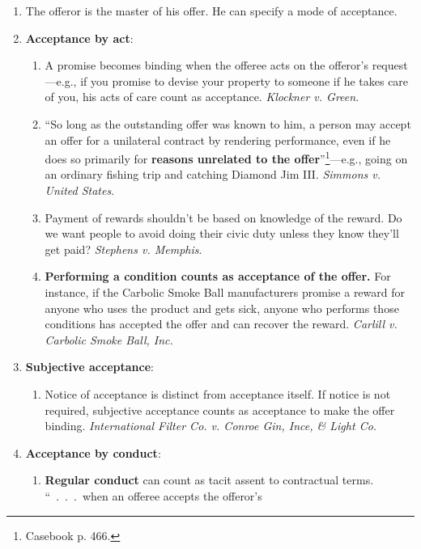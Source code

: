 \begin{enumerate}
    \item The offeror is the master of his offer. He can specify a mode of 
    acceptance.
    \item \textbf{Acceptance by act}:
    \begin{enumerate}
        \item A promise becomes binding when the offeree acts on the offeror's 
        request---e.g., if you promise to devise your property to someone if he 
        takes care of you, his acts of care count as acceptance. 
        \emph{Klockner v. Green}.
        \item ``So long as the outstanding offer was known to him, a person 
        may accept an offer for a unilateral contract by rendering 
        performance, even if he does so primarily for \textbf{reasons 
        unrelated to the offer}''\footnote{Casebook p. 466.}---e.g., going on 
        an ordinary fishing trip and catching Diamond Jim III. \emph{Simmons 
        v. United States}.
        \item Payment of rewards shouldn't be based on knowledge of the 
        reward. Do we want people to avoid doing their civic duty unless they 
        know they'll get paid? \emph{Stephens v. Memphis}.
        \item \textbf{Performing a condition counts as acceptance of the 
        offer.} For instance, if the Carbolic Smoke Ball manufacturers promise 
        a reward for anyone who uses the product and gets sick, anyone who 
        performs those conditions has accepted the offer and can recover the 
        reward. \emph{Carlill v. Carbolic Smoke Ball, Inc.}
    \end{enumerate}
    \item \textbf{Subjective acceptance}:
    \begin{enumerate}
        \item Notice of acceptance is distinct from acceptance itself. If 
        notice is not required, subjective acceptance counts as acceptance to 
        make the offer binding. \emph{International Filter Co. v. Conroe Gin, 
        Ince, \& Light Co.}
    \end{enumerate}
    \item \textbf{Acceptance by conduct}:
    \begin{enumerate}
        \item \textbf{Regular conduct} can count as tacit assent to 
        contractual terms. ``~.~.~.~when an offeree accepts the offeror's 

\end{enumerate}
\end{enumerate}
